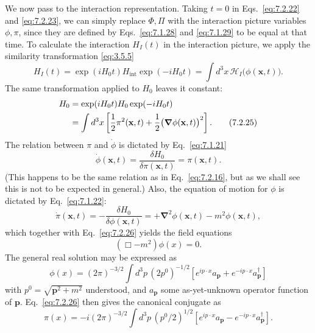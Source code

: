 We now pass to the interaction representation. Taking $t=0$ in
Eqs.~\eqref{eq:7.2.22} and \eqref{eq:7.2.23}, we can simply replace $\Phi,\Pi$ with the
interaction picture variables $\phi,\pi$, since they are defined by Eqs.~\eqref{eq:7.1.28} and
\eqref{eq:7.1.29} to be equal at that time. To calculate the interaction $H_I(t)$ in the
interaction picture, we apply the similarity transformation \eqref{eq:3.5.5}
\begin{equation}
H_I(t)=\exp(iH_0t)H_{\mathrm{int}}\exp(-iH_0t)
=\int d^3x\,\mathcal{H}_I\bigl(\phi(\mathbf{x},t)\bigr).
\tag{7.2.24}\label{eq:7.2.24}
\end{equation}
The same transformation applied to $H_0$ leaves it constant:
\begin{align}
H_0&=\exp(iH_0t)H_0\exp(-iH_0t)
\notag\\
&=\int d^3x\left[\frac12\pi^2(\mathbf{x},t)
+\frac12\bigl(\boldsymbol{\nabla}\phi(\mathbf{x},t)\bigr)^2\right].
\tag{7.2.25}\label{eq:7.2.25}
\end{align}
The relation between $\pi$ and $\dot\phi$ is dictated by Eq.~\eqref{eq:7.1.21}
\begin{equation}
\dot\phi(\mathbf{x},t)=\frac{\delta H_0}{\delta\pi(\mathbf{x},t)}
=\pi(\mathbf{x},t).
\tag{7.2.26}\label{eq:7.2.26}
\end{equation}
(This happens to be the same relation as in Eq.~\eqref{eq:7.2.16}, but as we shall
see this is not to be expected in general.) Also, the equation of motion for
$\phi$ is dictated by Eq.~\eqref{eq:7.1.22}:
\begin{equation}
\dot\pi(\mathbf{x},t)=-\frac{\delta H_0}{\delta\phi(\mathbf{x},t)}
=+\boldsymbol{\nabla}^2\phi(\mathbf{x},t)-m^2\phi(\mathbf{x},t),
\tag{7.2.27}\label{eq:7.2.27}
\end{equation}
which together with Eq.~\eqref{eq:7.2.26} yields the field equations
\begin{equation}
(\Box-m^2)\phi(x)=0.
\tag{7.2.28}\label{eq:7.2.28}
\end{equation}
The general real solution may be expressed as
\begin{equation}
\phi(x)=(2\pi)^{-3/2}\int d^3p\,(2p^0)^{-1/2}
\left[e^{ip\cdot x}a_{\mathbf{p}}+e^{-ip\cdot x}a^\dagger_{\mathbf{p}}\right]
\tag{7.2.29}\label{eq:7.2.29}
\end{equation}
with $p^0=\sqrt{\mathbf{p}^2+m^2}$ understood, and $a_{\mathbf{p}}$ some
as-yet-unknown operator function of $\mathbf{p}$. Eq.~\eqref{eq:7.2.26} then gives the
canonical conjugate as
\begin{equation}
\pi(x)=-i(2\pi)^{-3/2}\int d^3p\,(p^0/2)^{1/2}
\left[e^{ip\cdot x}a_{\mathbf{p}}-e^{-ip\cdot x}a^\dagger_{\mathbf{p}}\right].
\tag{7.2.30}\label{eq:7.2.30}
\end{equation}
